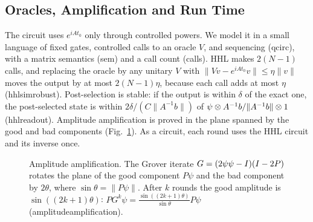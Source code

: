 \documentclass[runningheads]{llncs}
\let\ket\relax\let\bra\relax\let\braket\relax\let\ketbra\relax
\newcommand{\ket}[1]{|#1\rangle}
\newcommand{\bra}[1]{\langle #1|}
\newcommand{\braket}[2]{\langle #1|#2\rangle}
\newcommand{\ketbra}[2]{|#1\rangle\langle #2|}
\newcommand{\norm}[1]{\|#1\|}
\DeclareRobustCommand{\isa}[1]{\textsf{\def\_{\char95\allowbreak}#1}}
\begin{document}
\subsection{Oracles, Amplification and Run Time}

The circuit uses $e^{iAt_0}$ only through controlled powers. We model it in a small language of fixed
gates, controlled calls to an oracle $V$, and sequencing (\isa{qcirc}), with a matrix semantics
(\isa{sem}) and a call count (\isa{calls}). HHL makes $2(N-1)$ calls, and replacing the oracle by any
unitary $V$ with $\norm{Vv-e^{iAt_0}v}\le\eta\norm v$ moves the output by at most $2(N-1)\eta$, because each
call adds at most $\eta$ (\isa{hhl\_sim\_robust}). Post-selection is stable: if the output is within
$\delta$ of the exact one, the post-selected state is within $2\delta/(C\norm{A^{-1}b})$ of
$\psi\otimes A^{-1}b/\norm{A^{-1}b}\otimes\ket1$ (\isa{hhl\_readout}). Amplitude amplification is proved
in the plane spanned by the good and bad components (Fig.~\ref{fig:aa}). As a circuit, each round
uses the HHL circuit and its inverse once.

\begin{figure}[t]
\centering
{}
\caption{Amplitude amplification. The Grover iterate $G=(2\ketbra\psi\psi-I)(I-2P)$ rotates the plane
of the good component $P\psi$ and the bad component by $2\theta$, where $\sin\theta=\norm{P\psi}$. After
$k$ rounds the good amplitude is $\sin((2k+1)\theta)$: $PG^k\psi=\frac{\sin((2k+1)\theta)}{\sin\theta}P\psi$
(\isa{amplitude\_amplification}).}\label{fig:aa}
\end{figure}
\end{document}
